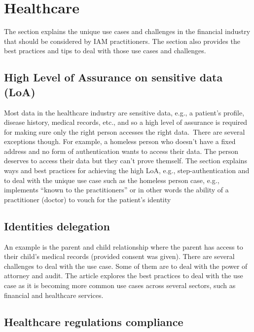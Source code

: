 \hypertarget{healthcare}{%
\chapter{Healthcare}\label{healthcare}}

The section explains the unique use cases and challenges in the
financial industry that should be considered by IAM practitioners. The
section also provides the best practices and tips to deal with those use
cases and challenges.

\hypertarget{high-level-of-assurance-on-sensitive-data-loa}{%
\section{High Level of Assurance on sensitive data
(LoA)}\label{high-level-of-assurance-on-sensitive-data-loa}}

Most data in the healthcare industry are sensitive data, e.g., a
patient's profile, disease history, medical records, etc., and so a high
level of assurance is required for making sure only the right person
accesses the right data.~There are several exceptions though. For
example, a homeless person who doesn't have a fixed address and no form
of authentication wants to access their data. The person deserves to
access their data but they can't prove themself. The section explains
ways and best practices for achieving the high LoA, e.g.,
step-authentication and to deal with the unique use case such as the
homeless person case, e.g., implements ``known to the practitioners'' or
in other words the ability of a practitioner (doctor) to vouch for the
patient's identity

\hypertarget{identities-delegation}{%
\section{Identities delegation}\label{identities-delegation}}

An example is the parent and child relationship where the parent has
access to their child's medical records (provided consent was given).
There are several challenges to deal with the use case. Some of them are
to deal with the power of attorney and audit. The article explores the
best practices to deal with the use case as it is becoming more common
use cases across several sectors, such as financial and healthcare
services.

\hypertarget{healthcare-regulations-compliance}{%
\section{Healthcare regulations
compliance}\label{healthcare-regulations-compliance}}

